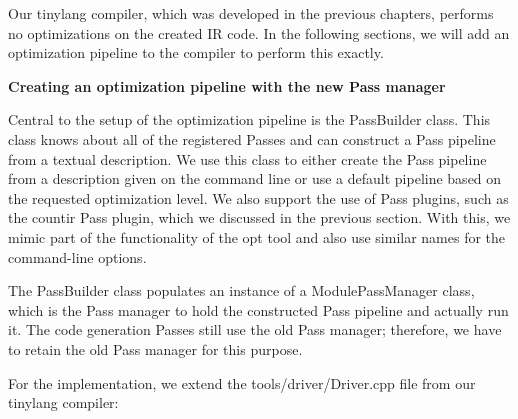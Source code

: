 
Our tinylang compiler, which was developed in the previous chapters, performs no optimizations on the created IR code. In the following sections, we will add an optimization pipeline to the compiler to perform this exactly.\par

\hspace*{\fill} \par %
\textbf{Creating an optimization pipeline with the new Pass manager}

Central to the setup of the optimization pipeline is the PassBuilder class. This class knows about all of the registered Passes and can construct a Pass pipeline from a textual description. We use this class to either create the Pass pipeline from a description given on the command line or use a default pipeline based on the requested optimization level. We also support the use of Pass plugins, such as the countir Pass plugin, which we discussed in the previous section. With this, we mimic part of the functionality of the opt tool and also use similar names for the command-line options.\par

The PassBuilder class populates an instance of a ModulePassManager class, which 
is the Pass manager to hold the constructed Pass pipeline and actually run it. The code generation Passes still use the old Pass manager; therefore, we have to retain the old Pass manager for this purpose. \par

For the implementation, we extend the tools/driver/Driver.cpp file from our tinylang compiler:\par

